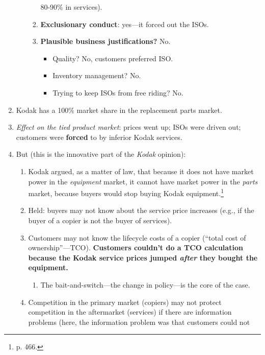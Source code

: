 \begin{enumerate}
\begin{enumerate}
\begin{enumerate}
            80-90\% in services).
            \item \textbf{Exclusionary conduct}: yes---it forced out the ISOs.
            \item \textbf{Plausible business justifications?} No.
            \begin{itemize}
                \item Quality? No, customers preferred ISO.
                \item Inventory management? No.
                \item Trying to keep ISOs from free riding? No.
            \end{itemize}
        \end{enumerate}
    \end{enumerate}
    \item Kodak has a 100\% market share in the replacement parts market.
    \item \emph{Effect on the tied product market}: prices went up; ISOs 
    were driven out; customers were \textbf{forced} to by inferior Kodak 
    services.
    \item But (this is the innovative part of the \emph{Kodak} opinion):
    \begin{enumerate}
        \item Kodak argued, as a matter of law, that because it does not 
        have market power in the \emph{equipment} market, it cannot have 
        market power in the \emph{parts} market, because buyers would stop 
        buying Kodak equipment.\footnote{p. 466.} 
        \item Held: buyers may not know about the service price increases 
        (e.g., if the buyer of a copier is not the buyer of services).
        \item Customers may not know the lifecycle costs of a copier 
        (``total cost of ownership''---TCO). \textbf{Customers couldn't do 
        a TCO calculation because the Kodak service prices jumped 
        \emph{after} they bought the equipment.}
        \begin{enumerate}
            \item The bait-and-switch---the change in policy---is the core 
            of the case.
        \end{enumerate}
        \item Competition in the primary market (copiers) may not protect 
        competition in the aftermarket (services) if there are information 
        problems (here, the information problem was that customers could not 

\end{enumerate}
\end{enumerate}
